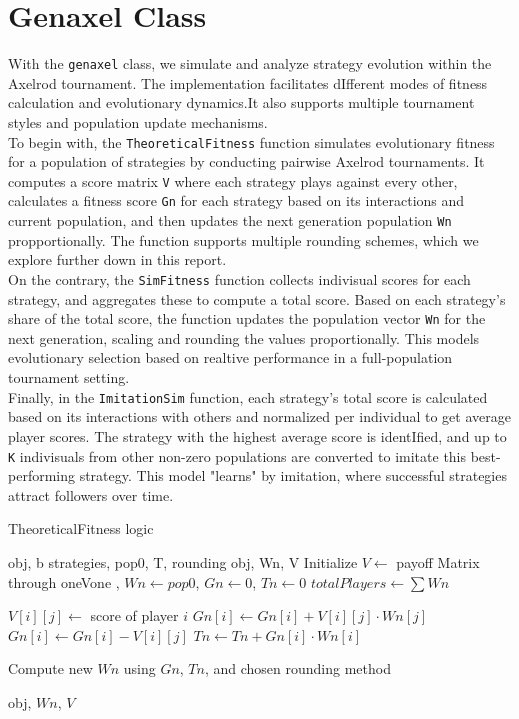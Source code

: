 \documentclass[12pt]{report}
\begin{document}
\section{Genaxel Class}
With the \texttt{genaxel} class, we simulate and analyze strategy evolution within the Axelrod tournament. The implementation facilitates dIfferent modes of
fitness calculation and evolutionary dynamics.It also supports multiple tournament styles and population update mechanisms.\\
To begin with, the \texttt{TheoreticalFitness} function simulates evolutionary fitness for a population of strategies by conducting pairwise Axelrod tournaments. It computes a score matrix \texttt{V} where each strategy plays against every other, calculates a fitness score \texttt{Gn} for each strategy based on its interactions and current population, and then updates the next generation population \texttt{Wn} propportionally. The function supports multiple rounding schemes, which we explore further down in this report.\\
On the contrary, the \texttt{SimFitness} function collects indivisual scores for each strategy, and aggregates these to compute a total score. Based on each strategy's share of the total score, the function updates the population vector \texttt{Wn} for the next generation, scaling and rounding the values proportionally. This models evolutionary selection based on realtive performance in a full-population tournament setting.\\
Finally, in the \texttt{ImitationSim} function, each strategy's total score is calculated based on its interactions with others and normalized per individual to get average player scores. The strategy with the highest average score is identIfied, and up to  \texttt{K} indivisuals from other non-zero populations are converted to imitate this best-performing strategy. This model "learns" by imitation, where successful strategies attract followers over time.
\clearpage
\begin{algorithm}
\caption{TheoreticalFitness logic}
\begin{algorithmic}[1]
\Require obj, b strategies, pop0, T, rounding
\Ensure obj, Wn, V
\State Initialize $V \gets $ payoff Matrix through oneVone , $Wn \gets pop0$, $Gn \gets 0$, $Tn \gets 0$
\State $totalPlayers \gets \sum Wn$

    \State $V[i][j] \gets$ score of player $i$
    \State $Gn[i] \gets Gn[i] + V[i][j] \cdot Wn[j]$
  \EndFor
  \State $Gn[i] \gets Gn[i] - V[i][j]$
  \State $Tn \gets Tn + Gn[i] \cdot Wn[i]$
\EndFor

\State Compute new $Wn$ using $Gn$, $Tn$, and chosen rounding method

\Return obj, $Wn$, $V$
\end{algorithmic}
\end{algorithm}
\end{document}
